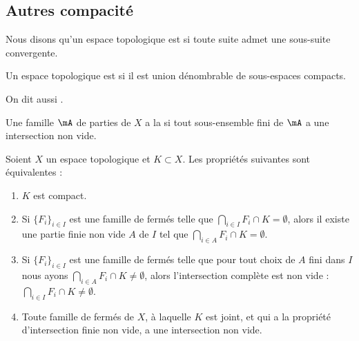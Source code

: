 \subsection{Autres compacité}

\begin{definition}        \label{DEFooTVDOooZbwOFK}
	Nous disons qu'un espace topologique est  si toute suite admet une sous-suite convergente.
\end{definition}

\begin{definition}	\label{DEFooSOLWooWlSiUn}
	Un espace topologique est  si il est union dénombrable de sous-espaces compacts.

	On dit aussi .
\end{definition}

\begin{definition}
	Une famille \( \mA\) de parties de \( X\) a la  si tout sous-ensemble fini de \( \mA\) a une intersection non vide.
\end{definition}

\begin{proposition}\label{PropXKUMiCj}
	Soient \( X\) un espace topologique et \( K\subset X\). Les propriétés suivantes sont équivalentes :
	\begin{enumerate}
		\item\label{ItemXYmGHFai}
		      \( K\) est compact.
		\item\label{ItemXYmGHFaii}
		      Si \( \{ F_i \}_{i\in I}\) est une famille de fermés telle que \( \bigcap_{i\in I}F_i \cap K =\emptyset\), alors il existe une partie finie non vide \( A\) de \( I\) tel que \( \bigcap_{i\in A}F_i \cap K =\emptyset\).
		\item\label{ItemXYmGHFaiii}
		      Si \( \{ F_i \}_{i\in I}\) est une famille de fermés telle que pour tout choix de \( A\) fini dans \( I\) nous ayons \( \bigcap_{i\in A}F_i \cap K \neq\emptyset\), alors l'intersection complète est non vide : \( \bigcap_{i\in I}F_i \cap K\neq\emptyset\).
		\item\label{ItemXYmGHFaiv}
		      Toute famille de fermés de \( X \), à laquelle \( K \) est joint, et qui a la propriété d'intersection finie non vide, a une intersection non vide.
	\end{enumerate}
\end{proposition}

